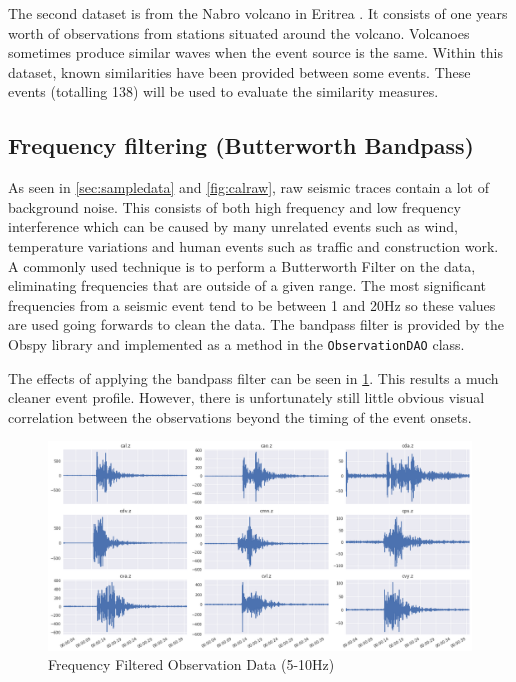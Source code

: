 \documentclass[../report.tex]{subfiles}
\begin{document}
	The second dataset is from the Nabro volcano in Eritrea \citep{eritrea1}.  It consists of one years worth of observations from stations situated around the volcano.  Volcanoes sometimes produce similar waves when the event source is the same.  Within this dataset, known similarities have been provided between some events.  These events (totalling 138) will be used to evaluate the similarity measures.

\subsection{Frequency filtering (Butterworth Bandpass)}
	As seen in \cref{sec:sampledata} and \cref{fig:calraw}, raw seismic traces contain a lot of background noise.  This consists of both high frequency and low frequency interference which can be caused by many unrelated events such as wind, temperature variations and human events such as traffic and construction work.  A commonly used technique \citep{man-seis-obs} is to perform a Butterworth Filter \citep{bandpass} on the data, eliminating frequencies that are outside of a given range.  The most significant frequencies from a seismic event tend to be between 1 and 20Hz so these values are used going forwards to clean the data.  The bandpass filter is provided by the Obspy library and implemented as a method in the \verb|ObservationDAO| class.
	
	The effects of applying the bandpass filter can be seen in \cref{fig:calbandpass}.  This results a much cleaner event profile.  However, there is unfortunately still little obvious visual correlation between the observations beyond the timing of the event onsets.

\begin{figure}[H]
	\centering
	\includegraphics[width=1\linewidth]{img/cal_bandpass}
	\caption{Frequency Filtered Observation Data (5-10Hz)}
	\label{fig:calbandpass}
\end{figure}
\end{document}
